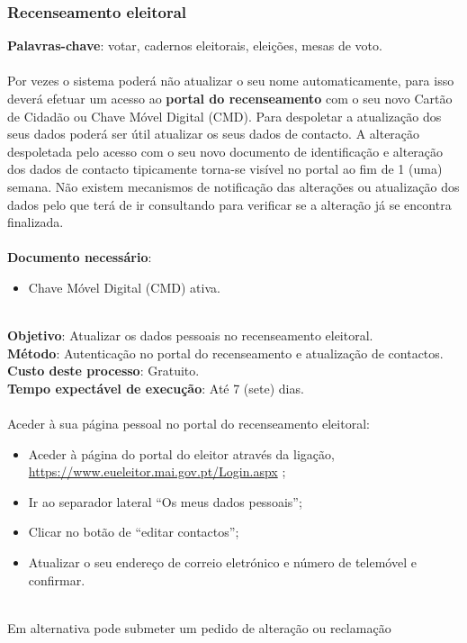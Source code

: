 \subsubsection{Recenseamento eleitoral}

\textbf{Palavras-chave}: votar, cadernos eleitorais, eleições, mesas de
voto. \\
\\
Por vezes o sistema poderá não atualizar o seu nome automaticamente,
para isso deverá efetuar um acesso ao \textbf{portal do recenseamento}
com o seu novo Cartão de Cidadão ou Chave Móvel Digital (CMD). Para
despoletar a atualização dos seus dados poderá ser útil atualizar os
seus dados de contacto. A alteração despoletada pelo acesso com o seu
novo documento de identificação e alteração dos dados de contacto
tipicamente torna-se visível no portal ao fim de 1 (uma) semana. Não
existem mecanismos de notificação das alterações ou atualização dos
dados pelo que terá de ir consultando para verificar se a alteração já
se encontra finalizada. \\
\\
\textbf{Documento necessário}:
\begin{itemize}
	\item Chave Móvel Digital (CMD) ativa.
\end{itemize}
\leavevmode\\
\textbf{Objetivo}: Atualizar os dados pessoais no recenseamento eleitoral. \\
\textbf{Método}: Autenticação no portal do recenseamento e atualização de contactos. \\
\textbf{Custo deste processo}: Gratuito. \\
\textbf{Tempo expectável de execução}: Até 7 (sete) dias. \\
\\
Aceder à sua página pessoal no portal do recenseamento eleitoral:
\begin{itemize}
	\item Aceder à página do portal do eleitor através da ligação, \url{https://www.eueleitor.mai.gov.pt/Login.aspx} ;
	\item Ir ao separador lateral ``Os meus dados pessoais'';
	\item Clicar no botão de ``editar contactos'';
	\item Atualizar o seu endereço de correio eletrónico e número de telemóvel e confirmar.
\end{itemize}
\leavevmode\\
Em alternativa pode submeter um pedido de alteração ou reclamação
